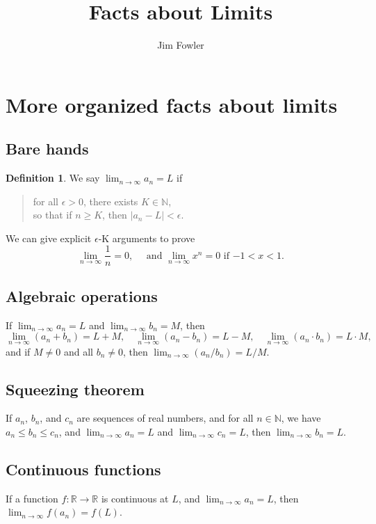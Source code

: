 \documentclass[12pt,letterpaper]{article}
\title{Facts about Limits}
\author{Jim Fowler}
\theoremstyle{definition}
\newtheorem*{definition*}{Definition}
\newcommand{\R}{\mathbb{R}}
\newcommand{\N}{\mathbb{N}}
\newcommand{\limn}{\displaystyle\lim_{n \to \infty}}
\begin{document}
\section*{More organized facts about limits}

\subsection*{Bare hands}

\begin{definition*}
We say $\limn a_n = L$ if
\begin{verse}
  for all $\epsilon > 0$, there exists $K \in \N$, \\
  so that if $n \geq K$, then $|a_n - L| < \epsilon$.
\end{verse}
\end{definition*}
We can give explicit $\epsilon$-K arguments to prove
$$
\lim_{n \to \infty} \frac{1}{n} = 0, \hspace{1em} \mbox{ and }
\lim_{n \to \infty} x^n = 0 \mbox{ if $-1 < x < 1$}.
$$

\subsection*{Algebraic operations}

If $\limn a_n = L$ and $\limn b_n = M$, then 
$$
\limn \left( a_n + b_n \right) = L + M, \hspace{1em}
\limn \left( a_n - b_n \right) = L - M, \hspace{1em}
\limn \left( a_n \cdot b_n \right) = L \cdot M, 
$$
and if $M \neq 0$ and all $b_n \neq 0$, then $\limn \left( a_n / b_n
\right) = L / M$.

\subsection*{Squeezing theorem}

If $a_n$, $b_n$, and $c_n$ are sequences of real numbers, and for all
$n \in \N$, we have $a_n \leq b_n \leq c_n$, and $\limn a_n = L$ and
$\limn c_n = L$, then $\limn b_n = L$.

\subsection*{Continuous functions}

If a function $f : \R \to \R$ is continuous at $L$, and $\limn a_n =
L$, then $\limn f(a_n) = f(L)$.
\end{document}
